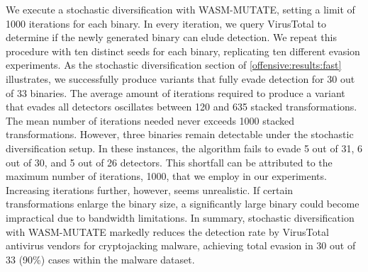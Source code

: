 \begin{strategy}
    \label{stochastic_div_vt}
    We execute a stochastic diversification with WASM-MUTATE, setting a limit of 1000 iterations for each binary. 
    In every iteration, we query VirusTotal to determine if the newly generated binary can elude detection. 
    We repeat this procedure with ten distinct seeds for each binary, replicating ten different evasion experiments. 
    As the stochastic diversification section of \autoref{offensive:results:fast} illustrates, we successfully produce variants that fully evade detection for 30 out of 33 binaries. 
    The average amount of iterations required to produce a variant that evades all detectors oscillates between 120 and 635 stacked transformations. 
    The mean number of iterations needed never exceeds 1000 stacked transformations. 
    However, three binaries remain detectable under the stochastic diversification setup. 
    In these instances, the algorithm fails to evade 5 out of 31, 6 out of 30, and 5 out of 26 detectors. 
    This shortfall can be attributed to the maximum number of iterations, 1000, that we employ in our experiments. 
    Increasing iterations further, however, seems unrealistic. 
    If certain transformations enlarge the binary size, a significantly large binary could become impractical due to bandwidth limitations. 
    In summary, stochastic diversification with WASM-MUTATE markedly reduces the detection rate by VirusTotal antivirus vendors for cryptojacking malware, achieving total evasion in 30 out of 33 (90\%) cases within the malware dataset. 
\end{strategy}
    

